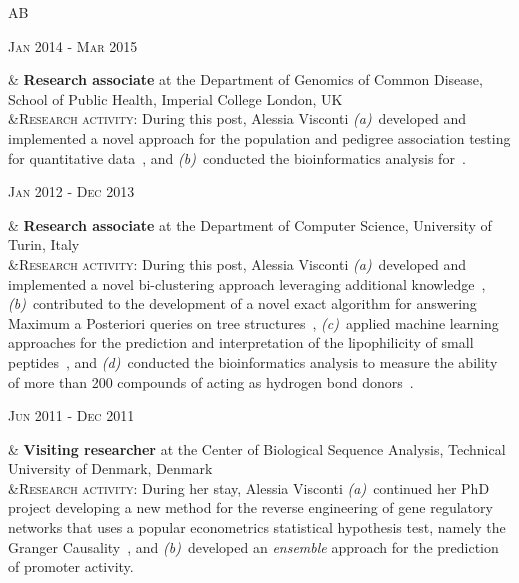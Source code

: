 \documentclass[a4paper,10pt]{article}
\newenvironment{doubletablelist}
{
	\vspace{-0.2cm}
	\begin{longtable}[!h]{AB}}{\end{longtable}
}
\newcommand{\dtlist}[2]{
\hspace{-3cm}
\noindent
	\begin{minipage}{0.22\textwidth}
	\begin{flushright}
	\textsc{#1}
	\end{flushright}
	\end{minipage}
	& #2\\[0.2cm]
}
\begin{document}
\begin{doubletablelist}
    \dtlist{Jan 2014 - Mar 2015}{\textbf{Research associate} at the Department of Genomics of Common Disease, School of Public Health, Imperial College London, UK  \\
	 &\textsc{Research activity}: During this post, Alessia Visconti \emph{(a)}~developed and implemented a novel approach for the population and pedigree association testing for quantitative data~\cite{Vis16}, and \emph{(b)}~conducted the bioinformatics analysis for~\cite{Joh15,AlM15,Gia16,Pui16}.%
	}
	\dtlist{Jan 2012 - Dec 2013}{\textbf{Research associate} at the Department of Computer Science, University of Turin, Italy \\ %
	 &\textsc{Research activity}: During this post, Alessia Visconti \emph{(a)}~developed and implemented a novel bi-clustering approach leveraging additional knowledge~\cite{Vis13a}, \emph{(b)}~contributed to the development of a novel exact algorithm for answering Maximum a Posteriori queries on tree structures~\cite{Esp13}, \emph{(c)}~applied machine learning approaches for the prediction and interpretation of the lipophilicity of small peptides~\cite{Vis15a}, and \emph{(d)}~conducted the bioinformatics analysis to measure the ability of more than 200 compounds of acting as hydrogen bond donors~\cite{Erm14}.%
	}
	\dtlist{Jun 2011 - Dec 2011}{\textbf{Visiting researcher} at the Center of Biological Sequence Analysis, Technical University of Denmark, Denmark 
	\\ %
		  &\textsc{Research activity}: During her stay, Alessia Visconti \emph{(a)}~continued her PhD project developing a new method for the reverse engineering of gene regulatory networks that uses a popular econometrics statistical hypothesis test, namely the Granger Causality~\cite{Vis12b}, and \emph{(b)}~developed an \emph{ensemble} approach for the prediction of promoter activity. %
	}


\end{doubletablelist}
\end{document}
